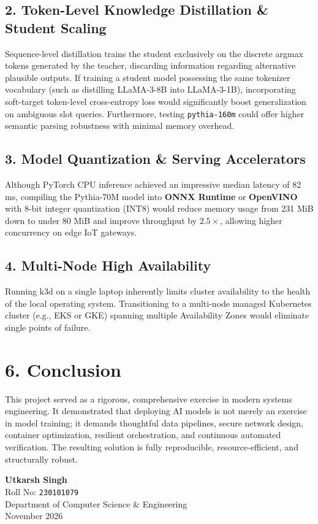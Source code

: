 \documentclass[10pt,a4paper]{article}
\begin{document}
\subsection*{2. Token-Level Knowledge Distillation \& Student Scaling}
Sequence-level distillation trains the student exclusively on the discrete argmax tokens generated by the teacher, discarding information regarding alternative plausible outputs. If training a student model possessing the same tokenizer vocabulary (such as distilling LLaMA-3-8B into LLaMA-3-1B), incorporating soft-target token-level cross-entropy loss would significantly boost generalization on ambiguous slot queries. Furthermore, testing \texttt{pythia-160m} could offer higher semantic parsing robustness with minimal memory overhead.

\subsection*{3. Model Quantization \& Serving Accelerators}
Although PyTorch CPU inference achieved an impressive median latency of 82 ms, compiling the Pythia-70M model into \textbf{ONNX Runtime} or \textbf{OpenVINO} with 8-bit integer quantization (INT8) would reduce memory usage from 231 MiB down to under 80 MiB and improve throughput by $2.5\times$, allowing higher concurrency on edge IoT gateways.

\subsection*{4. Multi-Node High Availability}
Running k3d on a single laptop inherently limits cluster availability to the health of the local operating system. Transitioning to a multi-node managed Kubernetes cluster (e.g., EKS or GKE) spanning multiple Availability Zones would eliminate single points of failure.

\section*{6. Conclusion}

This project served as a rigorous, comprehensive exercise in modern systems engineering. It demonstrated that deploying AI models is not merely an exercise in model training; it demands thoughtful data pipelines, secure network design, container optimization, resilient orchestration, and continuous automated verification. The resulting solution is fully reproducible, resource-efficient, and structurally robust.

\vspace{0.4cm}
\begin{flushright}
\textbf{Utkarsh Singh} \\
Roll No: \texttt{230101079} \\
Department of Computer Science \& Engineering \\
November 2026
\end{flushright}
\end{document}

